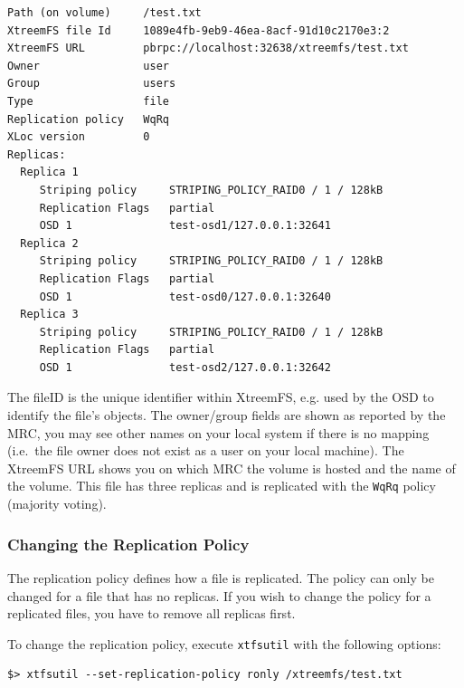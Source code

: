 \documentclass[a4paper,10pt]{book}
\begin{document}
\begin{verbatim}
Path (on volume)     /test.txt
XtreemFS file Id     1089e4fb-9eb9-46ea-8acf-91d10c2170e3:2
XtreemFS URL         pbrpc://localhost:32638/xtreemfs/test.txt
Owner                user
Group                users
Type                 file
Replication policy   WqRq
XLoc version         0
Replicas:
  Replica 1
     Striping policy     STRIPING_POLICY_RAID0 / 1 / 128kB
     Replication Flags   partial
     OSD 1               test-osd1/127.0.0.1:32641
  Replica 2
     Striping policy     STRIPING_POLICY_RAID0 / 1 / 128kB
     Replication Flags   partial
     OSD 1               test-osd0/127.0.0.1:32640
  Replica 3
     Striping policy     STRIPING_POLICY_RAID0 / 1 / 128kB
     Replication Flags   partial
     OSD 1               test-osd2/127.0.0.1:32642
\end{verbatim}


The fileID is the unique identifier within XtreemFS, e.g. used by the OSD to identify the file's objects. The owner/group fields are shown as reported by the MRC, you may see other names on your local system if there is no mapping (i.e.\ the file owner does not exist as a user on your local machine). The XtreemFS URL shows you on which MRC the volume is hosted and the name of the volume. This file has three replicas and is replicated with the \texttt{WqRq} policy (majority voting).

\subsubsection{Changing the Replication Policy}

The replication policy defines how a file is replicated. The policy can only be changed for a file that has no replicas. If you wish to change the policy for a replicated files, you have to remove all replicas first.

To change the replication policy, execute \texttt{xtfsutil} with the following options:

\begin{verbatim}
$> xtfsutil --set-replication-policy ronly /xtreemfs/test.txt
\end{verbatim}
\end{document}

